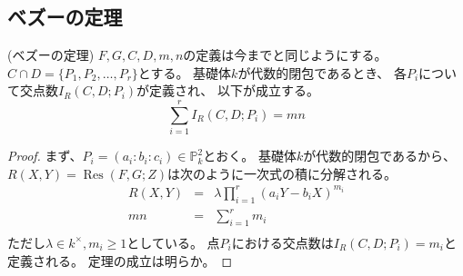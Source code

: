 \documentclass[a4]{article}
\newcommand{\proj}{\mathbb{P}}
\newcommand{\Res}{\operatorname{Res}}
\begin{document}
        \subsection{ベズーの定理}
        \begin{Them}(ベズーの定理)
        $F,G,C,D,m,n$の定義は今までと同じようにする。
        $C \cap D=\{P_{1},P_{2}, \dots, P_{r} \}$とする。
        基礎体$k$が代数的閉包であるとき、
        各$P_{i}$について交点数$I_{R}(C,D; P_i)$が定義され、
        以下が成立する。
        \[ \sum_{i=1}^{r}{I_{R}(C,D; P_i)}=mn \]
        \end{Them}
        \begin{proof}
            まず、$P_{i}=(a_i:b_i:c_i) \in \proj_{k}^2$とおく。
            基礎体$k$が代数的閉包であるから、
            $R(X,Y)=\Res(F,G; Z)$は次のように一次式の積に分解される。
            \begin{eqnarray*}
                R(X,Y)&=&\lambda \prod_{i=1}^{r}(a_i Y - b_i X)^{m_i} \\
                mn&=&\sum_{i=1}^{r}{m_i} \\
            \end{eqnarray*}
            ただし$\lambda \in k^{\times}, m_i \geq 1$としている。
            点$P_i$における交点数は$I_{R}(C,D; P_i)=m_i$と定義される。
            定理の成立は明らか。
            
        \end{proof}
\end{document}
